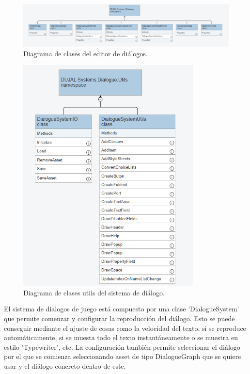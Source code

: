 \begin{figure}[H]
  \centering
    \includegraphics[width=500px,clip=true]{Dialogue_UML.png}
  \caption{Diagrama de clases del editor de diálogos.}
  \label{fig:dialogueUml1}
\end{figure}

\begin{figure}[H]
  \centering
    \includegraphics[width=350px,clip=true]{Dialogue_System_Utils.png}
  \caption{Diagrama de clases utils del sistema de diálogo.}
  \label{fig:dialogueUml2}
\end{figure}

El sistema de dialogos de juego está compuesto por una clase 'DialogueSystem' que permite comenzar y configurar la reproducción del diálogo. Esto se puede conseguir mediante 
el ajuste de cosas como la velocidad del texto, si se reproduce automáticamente, si se muesta todo el texto instantáneamente o se muestra en estilo 'Typewriter', etc. 
La configuración también permite seleccionar el diálogo por el que se comienza seleccionando asset de tipo DialogueGraph que se quiere usar y el diálogo concreto dentro de este.

